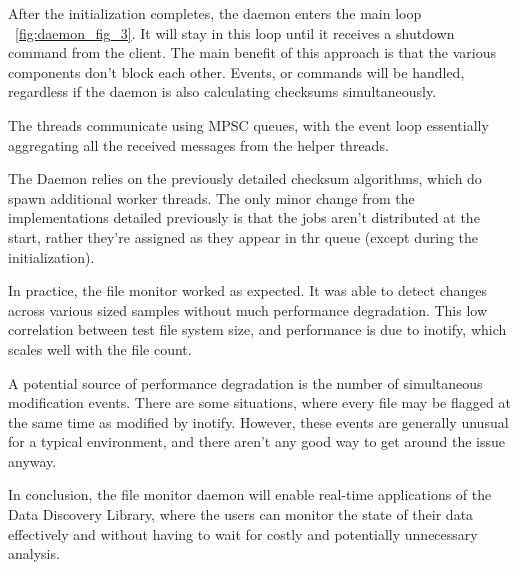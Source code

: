After the initialization completes, the daemon enters the main loop ~\ref{fig:daemon_fig_3}.
It will stay in this loop until it receives a shutdown command from the client.
The main benefit of this approach is that the various components don't block each other.
Events, or commands will be handled, regardless if the daemon is also calculating checksums simultaneously.

The threads communicate using MPSC queues, with the event loop essentially aggregating all the received messages
from the helper threads.

The Daemon relies on the previously detailed checksum algorithms, which do spawn additional worker threads.
The only minor change from the implementations detailed previously is that the jobs aren't distributed at the start,
rather they're assigned as they appear in thr queue (except during the initialization).


In practice, the file monitor worked as expected.
It was able to detect changes across various sized samples without much performance degradation.
This low correlation between test file system size, and performance is due to inotify, which scales well with
the file count.

A potential source of performance degradation is the number of simultaneous modification events.
There are some situations, where every file may be flagged at the same time as modified by inotify.
However, these events are generally unusual for a typical environment, and there aren't any good
way to get around the issue anyway.

In conclusion, the file monitor daemon will enable real-time applications of
the Data Discovery Library, where the users can monitor the state of their
data effectively and without having to wait for costly and potentially
unnecessary analysis.